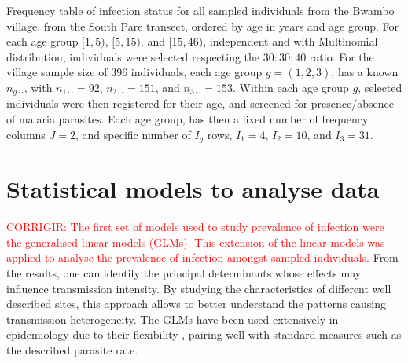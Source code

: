 \makeatletter
\setlength{\@fptop}{0pt}
\begin{table}[H]
\centering
\caption[Frequency table of infection status in the Bwambo village]{Frequency table of infection status for all sampled individuals from the Bwambo village, from the South Pare transect, ordered by age in years and age group. For each age group $[1,5)$, $[5,15)$, and $[15,46)$, independent and with Multinomial distribution, individuals were selected respecting the $30:30:40$ ratio.
For the village sample size of 396 individuals, each age group $g=(1,2,3)$, has a known $n_{g\cdot\cdot}$, with $n_{1\cdot\cdot}=92$, $n_{2\cdot\cdot}=151$, and $n_{3\cdot\cdot}=153$.
Within each age group $g$, selected individuals were then registered for their age, and screened for presence/absence of malaria parasites.
Each age group, has then a fixed number of frequency columns $J=2$, and specific number of $I_g$ rows, $I_1=4$, $I_2=10$, and $I_3=31$.}
\label{tab:multinomial.bwambo}
\begin{adjustbox}{totalheight=\baselineskip}

\end{adjustbox}
\end{table}
\makeatother


\section{Statistical models to analyse data}
\label{sec:models}

\textcolor{red}{CORRIGIR: The first set of models used to study prevalence of infection were the generalised linear models (GLMs).
This extension of the linear models was applied to analyse the prevalence of infection amongst sampled individuals.}
From the results, one can identify the principal determinants whose effects may influence transmission intensity.
By studying the characteristics of different well described sites, this approach allows to better understand the patterns causing transmission heterogeneity.
The GLMs have been used extensively in epidemiology due to their flexibility \cite{nelder1972glm,andersson2012stochastic}, pairing well with standard measures such as the described parasite rate.

